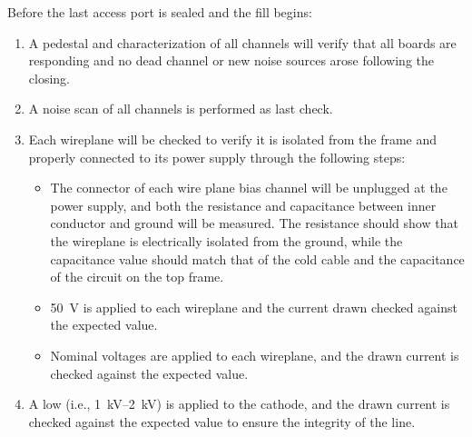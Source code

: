 Before the last access port is sealed and the fill begins: 
\begin{enumerate}

    \item A pedestal and  characterization of all  channels will verify that all   boards are responding and no dead channel or new noise sources arose following the  closing.
    
    \item A noise scan of all  channels is performed as last check. %

    \item Each  wireplane will be checked to verify it is isolated from the  frame and properly connected to its  power supply through the following steps:
    
\begin{itemize}

    \item The  connector of each wire plane bias channel will be unplugged at the power supply, and both the resistance and capacitance between inner conductor and ground will be measured. 
    The resistance should show that the wireplane is electrically isolated from the ground, while the capacitance value should match that of the cold  cable and the capacitance of the circuit on the  top frame.

    \item \SI{50}{V} is applied to each wireplane and the current drawn checked against the expected value.
    
    \item Nominal voltages are applied to each wireplane, and the  drawn current is checked against the expected value. 
    
\end{itemize}

    \item A low  (i.e., \SIrange{1}{2}{kV}) is applied to the cathode, and the drawn current is checked against the expected value to ensure the integrity of the  line.

\end{enumerate}


